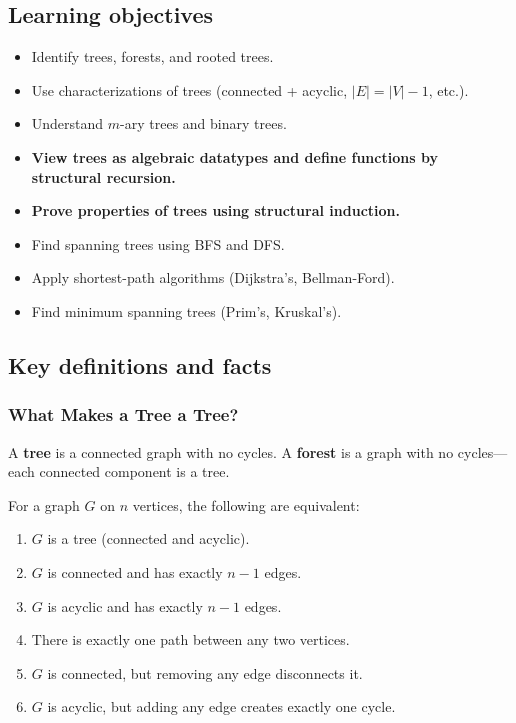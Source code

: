 \subsection*{Learning objectives}
\begin{itemize}
  \item Identify trees, forests, and rooted trees.
  \item Use characterizations of trees (connected + acyclic, $|E| = |V| - 1$, etc.).
  \item Understand $m$-ary trees and binary trees.
  \item \textbf{View trees as algebraic datatypes and define functions by structural recursion.}
  \item \textbf{Prove properties of trees using structural induction.}
  \item Find spanning trees using BFS and DFS.
  \item Apply shortest-path algorithms (Dijkstra's, Bellman-Ford).
  \item Find minimum spanning trees (Prim's, Kruskal's).
\end{itemize}

\subsection*{Key definitions and facts}

\subsubsection*{What Makes a Tree a Tree?}

\begin{definition}[Tree]
A \textbf{tree} is a connected graph with no cycles. A \textbf{forest} is a graph with no cycles---each connected component is a tree.
\end{definition}

\begin{theorem}
For a graph $G$ on $n$ vertices, the following are equivalent:
\begin{enumerate}
  \item $G$ is a tree (connected and acyclic).
  \item $G$ is connected and has exactly $n - 1$ edges.
  \item $G$ is acyclic and has exactly $n - 1$ edges.
  \item There is exactly one path between any two vertices.
  \item $G$ is connected, but removing any edge disconnects it.
  \item $G$ is acyclic, but adding any edge creates exactly one cycle.
\end{enumerate}
\end{theorem}

